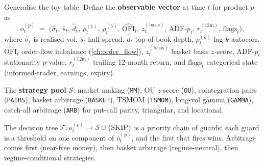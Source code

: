 Generalise the toy table. Define the \textbf{observable vector} at
time $t$ for product $p$ as
\begin{equation}
  o_t^{(p)} \;=\;
  \big(
    \hat{\sigma}_t,\,
    \hat{s}_t,\,
    \hat{d}_t,\,
    \rho_t^{(1)},\,\rho_t^{(5)},\,
    \widehat{\mathrm{OFI}}_t,\,
    z_t^{(\mathrm{basis})},\,
    \text{ADF-}p_t,\,
    r_t^{(12\mathrm{m})},\,
    \mathrm{flags}_t
  \big),
  \label{eq:wsw_obs_vec}
\end{equation}
where $\hat{\sigma}_t$ is realised vol, $\hat{s}_t$ half-spread,
$\hat{d}_t$ top-of-book depth, $\rho_t^{(k)}$ lag-$k$ autocorr,
$\widehat{\mathrm{OFI}}_t$ order-flow imbalance
(\cref{ch:order_flow}), $z_t^{(\mathrm{basis})}$ basket basis
$z$-score, $\text{ADF-}p_t$ stationarity $p$-value,
$r_t^{(12\mathrm{m})}$ trailing 12-month return, and
$\mathrm{flags}_t$ categorical state (informed-trader, earnings,
expiry).

The \textbf{strategy pool} $\mathcal{S}$: market making
(\texttt{MM}), OU $z$-score (\texttt{OU}), cointegration pairs
(\texttt{PAIRS}), basket arbitrage (\texttt{BASKET}), TSMOM
(\texttt{TSMOM}), long-vol gamma (\texttt{GAMMA}), catch-all
arbitrage (\texttt{ARB}) for put-call parity, triangular, and
locational.

The decision tree $\mathcal{T}: o_t^{(p)} \to \mathcal{S} \cup
\{\text{SKIP}\}$ is a priority chain of guards: each guard is a
threshold on one component of $o_t^{(p)}$, and the first that
fires wins. Arbitrage comes first (near-free money), then basket
arbitrage (regime-neutral), then regime-conditional strategies.

